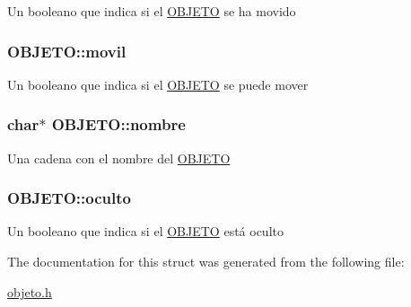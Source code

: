 \label{structOBJETO_a7a534a47dfbee7fb8e61a959f6e0c58c}
Un booleano que indica si el \hyperlink{structOBJETO}{OBJETO} se ha movido \hypertarget{structOBJETO_a61c56c0689f2dafb7c5ee307ca4b0e14}{
\subsubsection[{movil}]{ {\bf OBJETO::movil}}}
\label{structOBJETO_a61c56c0689f2dafb7c5ee307ca4b0e14}
Un booleano que indica si el \hyperlink{structOBJETO}{OBJETO} se puede mover \hypertarget{structOBJETO_a5dcd58f147feb097bab5361e7b5381fa}{
\subsubsection[{nombre}]{\setlength{\rightskip}{0pt plus 5cm}char$\ast$ {\bf OBJETO::nombre}}}
\label{structOBJETO_a5dcd58f147feb097bab5361e7b5381fa}
Una cadena con el nombre del \hyperlink{structOBJETO}{OBJETO} \hypertarget{structOBJETO_a5e530e872fe10273e41f14fc8cab153c}{
\subsubsection[{oculto}]{ {\bf OBJETO::oculto}}}
\label{structOBJETO_a5e530e872fe10273e41f14fc8cab153c}
Un booleano que indica si el \hyperlink{structOBJETO}{OBJETO} está oculto 

The documentation for this struct was generated from the following file:\begin{DoxyCompactItemize}
\item 
\hyperlink{objeto_8h}{objeto.h}\end{DoxyCompactItemize}
